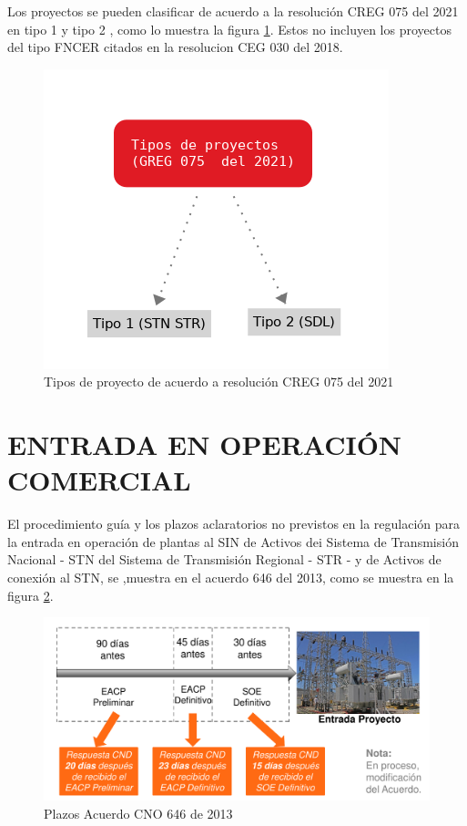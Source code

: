 \documentclass[a5paper]{book}%
\begin{document}
Los proyectos se pueden clasificar de acuerdo a la resolución CREG 075
del 2021 en tipo 1 y tipo 2 , como lo muestra la figura
\ref{fig:tipoproyecto}. Estos no incluyen los proyectos del tipo
\ac{FNCER} citados en la resolucion CEG 030 del 2018.


\begin{figure}[H]
  \centering \includegraphics[width=1\linewidth]{tipoproyecto}
  \caption{Tipos de proyecto de acuerdo a resolución CREG 075 del
    2021}
  \label{fig:tipoproyecto}
\end{figure}

    \section{ENTRADA EN OPERACIÓN COMERCIAL}

    El procedimiento guía y los plazos aclaratorios no previstos en la regulación para la entrada en operación de plantas al SIN de Activos dei Sistema de Transmisión Nacional - STN del Sistema de Transmisión Regional - STR - y de Activos de conexión al STN,  se ,muestra en el acuerdo 646 del 2013, como se muestra en la figura \ref{fig:plazo646}.

    \begin{figure}[H]
      \caption{Plazos Acuerdo CNO 646 de 2013}
      \label{fig:plazo646}
      \includegraphics[width=\linewidth]{plazo_cno}
      \end{figure}
\end{document}
